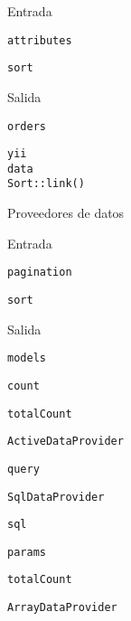\begin{longenum}
\begin{longenum}
\begin{longenum}
            \item Entrada
            \begin{longenum}
                \item \texttt{attributes}
                \item \texttt{sort}
            \end{longenum}
            \item Salida
            \begin{longenum}
                \item \texttt{orders}
            \end{longenum}
            \item \texttt{yii\\data\\Sort::link()}
        \end{longenum}
        \item Proveedores de datos
        \begin{longenum}
            \item Entrada
            \begin{longenum}
                \item \texttt{pagination}
                \item \texttt{sort}
            \end{longenum}
            \item Salida
            \begin{longenum}
                \item \texttt{models}
                \item \texttt{count}
                \item \texttt{totalCount}
            \end{longenum}
            \item \texttt{ActiveDataProvider}
            \begin{longenum}
                \item \texttt{query}
            \end{longenum}
            \item \texttt{SqlDataProvider}
            \begin{longenum}
                \item \texttt{sql}
                \item \texttt{params}
                \item \texttt{totalCount}
            \end{longenum}
            \item \texttt{ArrayDataProvider}

\end{longenum}
\end{longenum}
\end{longenum}
